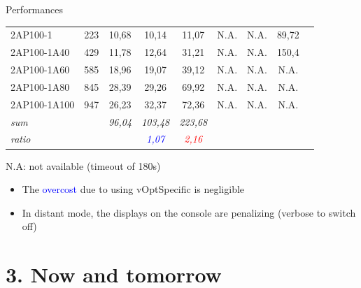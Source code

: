 \documentclass[10pt,xcolor=dvipsnames]{beamer}
\newcommand{\red}{\textcolor{red}}
\newcommand{\blue}{\textcolor{blue}}
\begin{document}
\begin{frame}{Performances}
{\begin{center}
\begin{tabular}{| l | c || c | c | c | c | c | c | c |}
    \hline 												
2AP100-1	        &223 	&	10,68	&	10,14	&	11,07	&	N.A.	&	N.A.	&	89,72	\\
2AP100-1A40	& 429 &	11,78	&	12,64	&	31,21	&	N.A.	&	N.A.	&	150,4	\\
2AP100-1A60	& 585 &	18,96	&	19,07	&	39,12	&	N.A.	&	N.A.	&	N.A.	\\
2AP100-1A80	& 845 &	28,39	&	29,26	&	69,92	&	N.A.	&	N.A.	&	N.A.	\\
2AP100-1A100	& 947 &	26,23	&	32,37	&	72,36	&	N.A.	&	N.A.	&	N.A.	\\                                          
  \hspace{5mm} \textit{sum}    &        &    \textit{96,04}  &	\textit{103,48}  &	\textit{223,68}  &   &  &   \\
  \hspace{5mm} \textit{ratio}     &        &             &     \textit{\blue{1,07}}	&      \textit{\red{2,16}}	 & 	           &   	&  \\	 

    \hline
\end{tabular}
\end{center}

N.A: not available (timeout of 180s)
}

{\small 
%
\begin{itemize}
\item The \blue{overcost} due to using vOptSpecific is negligible%

\item In distant mode, the displays on the console are penalizing (verbose to switch off) %
\end{itemize}
}

%
%

\end{frame}


\section{3. Now and tomorrow}
\end{document}
